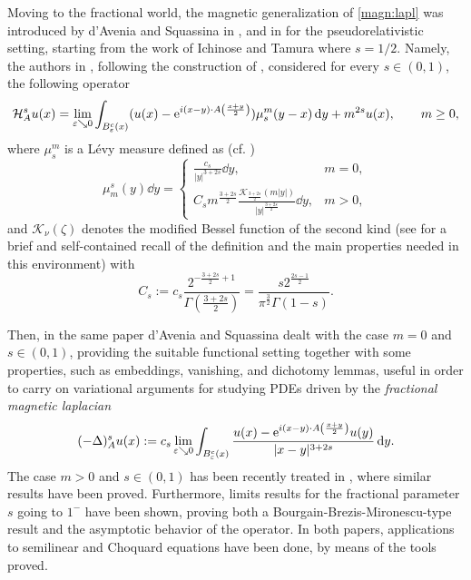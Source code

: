 \documentclass[leqno,11pt]{amsart}
\newcommand{\cH}{{\mathcal H}}
\newcommand{\cK}{{\mathcal K}}
\newcommand{\eps}{\varepsilon}
\numberwithin{equation}{section}
\def\e{{\rm e}}
\begin{document}
\medskip

Moving to the fractional world, the magnetic generalization of \eqref{magn:lapl} was introduced by d'Avenia and Squassina in \cite{dAveniaSquassina}, and in \cite{BerninidAvenia} for  the pseudorelativistic setting, starting from the work of Ichinose and Tamura \cite{IchinoseTamura} where $s=1/2$. Namely, the authors in \cite{dAveniaSquassina}, following the construction of \cite{IchinoseTamura}, considered for every $s \in (0,1)$, the following operator
\begin{equation}
    \label{dAveniaSquassina:def}
    \cH^s_Au(x)=\lim_{\eps \searrow 0} \int_{B_\eps^c(x)}(u(x)-\e^{i(x-y)\cdot A\left(\frac{x+y}{2}\right)})\mu_s^m(y-x) \dd y + m^{2s}u(x),\qquad m\ge 0,
\end{equation}
where $\mu^m_s$ is a L\'evy measure defined as 
(cf. \cite[Eq. (1.9)]{BerninidAvenia})
\begin{equation}
    \label{Levy:measure:p=2}
    \mu_m^s(y) \dd y=
    \begin{cases}
        \frac{c_s}{|y|^{3+2s}}\dd y, &m=0,\\
        C_sm^{\frac{3+2s}{2}}\frac{\cK_{\frac{3+2s}{2}}(m|y|)}{|y|^{\frac{3+2s}{2}}}\dd y, &m>0,
    \end{cases}
\end{equation}
and $\cK_\nu(\zeta)$ denotes the modified Bessel function of the second kind (see \cite[Appendix A]{BerninidAvenia} for a brief and self-contained recall of the definition and the main properties needed in this environment) with 
\begin{equation}
    C_s:= c_s\frac{2^{-\frac{3+2s}{2}+1}}{\Gamma\left(\frac{3+2s}{2}\right)} = \frac{s2^{\frac{2s-1}{2}}}{\pi^\frac32\Gamma(1-s)}.
\end{equation}

Then, in the same paper d’Avenia and Squassina dealt with the case $m=0$ and $s \in (0,1)$, providing the suitable functional setting together with some properties, such as embeddings, vanishing, and dichotomy lemmas, useful in order to carry on variational arguments for studying PDEs driven by the \textit{fractional magnetic laplacian}
\begin{equation}
    \label{dAveniaSquassina:def:2}
    (-\Delta)^s_Au(x):=c_s\lim_{\eps \searrow 0} \int_{B_\eps^c(x)}\frac{u(x)-\e^{i(x-y)\cdot A\left(\frac{x+y}{2}\right)}u(y)}{|x-y|^{3+2s}} \dd y.
\end{equation}
The case $m>0$ and $s \in (0,1)$ has been recently treated in \cite{BerninidAvenia}, where similar results have been proved. Furthermore, limits results for the fractional parameter $s$ going to $1^-$ have been shown, proving both a Bourgain-Brezis-Mironescu-type result and the asymptotic behavior of the operator. In both papers, applications to semilinear and Choquard equations have been done, by means of the tools proved.
\end{document}
